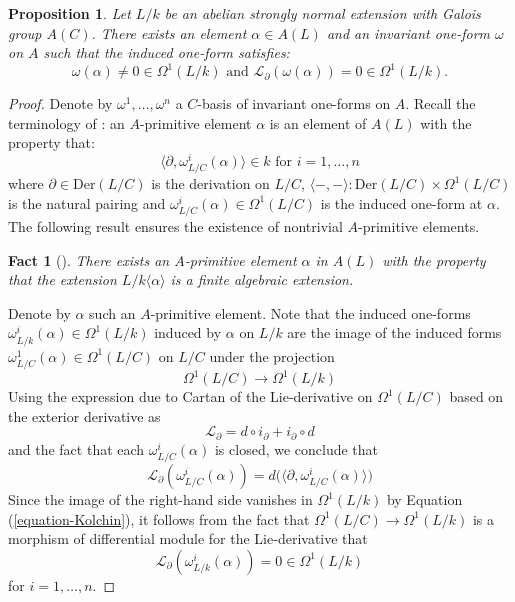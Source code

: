 \documentclass[12pt]{amsart}
\theoremstyle{definition}
\theoremstyle{plain}
\newtheorem{Prop}[defn]{Proposition}
\newtheorem{fact}[defn]{Fact}
\theoremstyle{exampstyle}\newtheorem{thmx}{Theorem}
\theoremstyle{exampstyle}\newtheorem{thmxbis}{Theorem}
\begin{document}
\begin{Prop}\label{proposition-Kolchin} 
Let $L/k$ be an {\em abelian strongly normal extension} with Galois group $A(C)$. There exists an element $\alpha \in A(L)$ and an invariant one-form $\omega$ on $A$ such that the induced one-form satisfies:  
$$ \omega(\alpha) \neq 0 \in \Omega^1(L/k) \text{ and } \mathcal L_\partial(\omega(\alpha)) = 0 \in \Omega^1(L/k).$$ 
\end{Prop}


\begin{proof} 
Denote by $\omega^1,\ldots, \omega^n$ a $C$-basis of invariant one-forms on $A$. Recall the terminology of \cite{Kolchin-abelian}: an $A$-primitive element $\alpha$ is an element of $A(L)$ with the property that:
\begin{equation}\label{equation-Kolchin} \langle \partial, \omega^i_{L/C}(\alpha) \rangle \in k \text{ for } i = 1,\ldots, n
\end{equation}
where $\partial \in \mathrm{Der}(L/C)$ is the derivation on $L/C$, $\langle - , - \rangle : \mathrm{Der}(L/C) \times \Omega^1(L/C)$ is the natural pairing and $\omega^i_{L/C}(\alpha) \in \Omega^1(L/C)$ is the induced one-form at $\alpha$. The following result ensures the existence of nontrivial $A$-primitive elements.

\begin{fact}[{\cite[pp. 782]{Kolchin-abelian}}]
There exists an $A$-primitive element $\alpha$ in $A(L)$ with the property that the extension $L/k \langle \alpha\rangle$ is a finite algebraic extension.
\end{fact}

Denote by $\alpha$ such an $A$-primitive element. Note that the induced one-forms $\omega^i_{L/k}(\alpha) \in \Omega^1(L/k)$  induced by $\alpha$ on $L/k$ are the image of the induced forms $\omega^1_{L/C}(\alpha) \in \Omega^1(L/C)$ on $L/C$ under the projection
$$ \Omega^1(L/C) \rightarrow \Omega^1(L/k)$$ 
Using the expression due to Cartan of the Lie-derivative  on $\Omega^1(L/C)$ based on the exterior derivative as
$$ \mathcal L_\partial = d \circ i_\partial + i_\partial \circ d $$
and the fact that each $\omega^i_{L/C}(\alpha)$ is closed, we conclude that
$$ \mathcal L_\partial(\omega^i_{L/C}(\alpha)) = d \Big( \langle \partial, \omega_{L/C}^i(\alpha)\rangle \Big) $$ 
Since the image of the right-hand side vanishes in $\Omega^1(L/k)$ by Equation (\ref{equation-Kolchin}), it follows from the fact that $\Omega^1(L/C) \rightarrow \Omega^1(L/k)$ is a morphism of differential module for the Lie-derivative that
$$\mathcal L_\partial(\omega^i_{L/k}(\alpha)) = 0 \in \Omega^1(L/k)$$  for $i = 1,\ldots, n$.


\end{proof}
\end{document}
